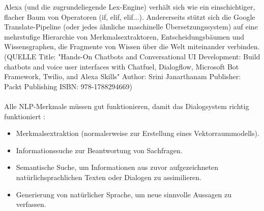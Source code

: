 Alexa (und die zugrundeliegende Lex-Engine) verhält sich wie ein einschichtiger, flacher Baum von Operatoren (if, elif, elif...). 
Andererseits stützt sich die Google Translate-Pipeline (oder jedes ähnliche maschinelle Übersetzungssystem) auf eine mehrstufige Hierarchie von Merkmalsextraktoren, Entscheidungsbäumen und Wissensgraphen, die Fragmente von Wissen über die Welt miteinander verbinden.(QUELLE Title: "Hands-On Chatbots and Conversational UI Development: Build chatbots and voice user interfaces with Chatfuel, Dialogflow, Microsoft Bot Framework, Twilio, and Alexa Skills"
Author: Srini Janarthanam
Publisher: Packt Publishing
ISBN: 978-1788294669)\\\\
Alle \ac{NLP}-Merkmale müssen gut funktionieren, damit das Dialogsystem richtig funktioniert \cite{lane_natural_2019}:
\begin{itemize}
    \item Merkmalsextraktion (normalerweise zur Erstellung eines Vektorraummodells).
    \item Informationssuche zur Beantwortung von Sachfragen.
    \item Semantische Suche, um Informationen aus zuvor aufgezeichneten natürlichsprachlichen Texten oder Dialogen zu assimilieren.
    \item Generierung von natürlicher Sprache, um neue sinnvolle Aussagen zu verfassen.
\end{itemize}
